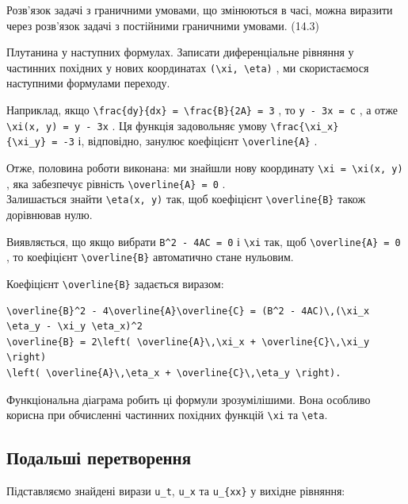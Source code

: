 \documentclass[
  ukrainian,
]{article}
\begin{document}
Розв'язок задачі з граничними умовами, що змінюються в часі, можна
виразити через розв'язок задачі з постійними граничними умовами. (14.3)

Плутанина у наступних формулах. Записати диференціальне рівняння у
частинних похідних у нових координатах
\texttt{(\textbackslash{}xi,\ \textbackslash{}eta)} , ми скористаємося
наступними формулами переходу.

Наприклад, якщо
\texttt{\textbackslash{}frac\{dy\}\{dx\}\ =\ \textbackslash{}frac\{B\}\{2A\}\ =\ 3}
, то \texttt{y\ -\ 3x\ =\ c} , а отже
\texttt{\textbackslash{}xi(x,\ y)\ =\ y\ -\ 3x} . Ця функція задовольняє
умову
\texttt{\textbackslash{}frac\{\textbackslash{}xi\_x\}\{\textbackslash{}xi\_y\}\ =\ -3}
і, відповідно, занулює коефіцієнт \texttt{\textbackslash{}overline\{A\}}
.

Отже, половина роботи виконана: ми знайшли нову координату
\texttt{\textbackslash{}xi\ =\ \textbackslash{}xi(x,\ y)} , яка
забезпечує рівність \texttt{\textbackslash{}overline\{A\}\ =\ 0} .\\
Залишається знайти \texttt{\textbackslash{}eta(x,\ y)} так, щоб
коефіцієнт \texttt{\textbackslash{}overline\{B\}} також дорівнював нулю.

Виявляється, що якщо вибрати \texttt{B\^{}2\ -\ 4AC\ =\ 0} і
\texttt{\textbackslash{}xi} так, щоб
\texttt{\textbackslash{}overline\{A\}\ =\ 0} , то коефіцієнт
\texttt{\textbackslash{}overline\{B\}} автоматично стане нульовим.

Коефіцієнт \texttt{\textbackslash{}overline\{B\}} задається виразом:

\begin{verbatim}
\overline{B}^2 - 4\overline{A}\overline{C} = (B^2 - 4AC)\,(\xi_x \eta_y - \xi_y \eta_x)^2
\overline{B} = 2\left( \overline{A}\,\xi_x + \overline{C}\,\xi_y \right)
\left( \overline{A}\,\eta_x + \overline{C}\,\eta_y \right).
\end{verbatim}

Функціональна діаграма робить ці формули зрозумілішими. Вона особливо
корисна при обчисленні частинних похідних функцій
\texttt{\textbackslash{}xi} та \texttt{\textbackslash{}eta}.

\subsection{Подальші
перетворення}\label{ux43fux43eux434ux430ux43bux44cux448ux456-ux43fux435ux440ux435ux442ux432ux43eux440ux435ux43dux43dux44f}

Підставляємо знайдені вирази \texttt{u\_t}, \texttt{u\_x} та
\texttt{u\_\{xx\}} у вихідне рівняння:
\end{document}
